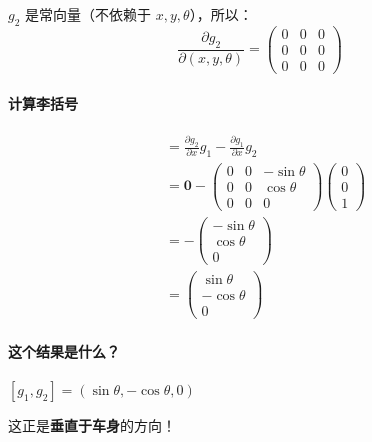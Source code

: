 $g_2$ 是常向量（不依赖于 $x, y, \theta$），所以：
\begin{equation}
\frac{\partial g_2}{\partial (x, y, \theta)} = \begin{pmatrix} 0 & 0 & 0 \\ 0 & 0 & 0 \\ 0 & 0 & 0 \end{pmatrix}
\end{equation}

\paragraph{计算李括号}

\begin{align}
[g_1, g_2] &= \frac{\partial g_2}{\partial x} g_1 - \frac{\partial g_1}{\partial x} g_2 \\
&= \mathbf{0} - \begin{pmatrix} 0 & 0 & -\sin\theta \\ 0 & 0 & \cos\theta \\ 0 & 0 & 0 \end{pmatrix} \begin{pmatrix} 0 \\ 0 \\ 1 \end{pmatrix} \\
&= -\begin{pmatrix} -\sin\theta \\ \cos\theta \\ 0 \end{pmatrix} \\
&= \begin{pmatrix} \sin\theta \\ -\cos\theta \\ 0 \end{pmatrix}
\end{align}

\paragraph{这个结果是什么？}

$[g_1, g_2] = (\sin\theta, -\cos\theta, 0)$

这正是\textbf{垂直于车身}的方向！

